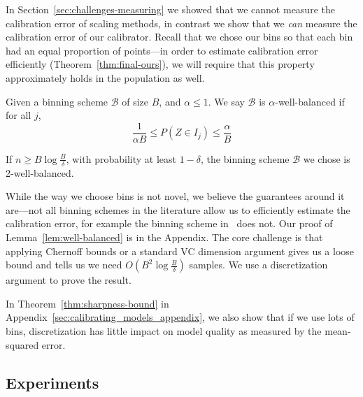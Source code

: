 In Section~\ref{sec:challenges-measuring} we showed that we cannot measure the calibration error of scaling methods, in contrast we show that we \emph{can} measure the calibration error of our calibrator. Recall that we chose our bins so that each bin had an equal proportion of points---in order to estimate calibration error efficiently (Theorem~\ref{thm:final-ours}), we will require that this property approximately holds in the population as well.

\begin{definition}
Given a binning scheme $\mathcal{B}$ of size $B$, and $\alpha \leq 1$. We say $\mathcal{B}$ is $\alpha$-well-balanced if for all $j$,
\[ \frac{1}{\alpha B} \leq P(Z \in I_j) \leq \frac{\alpha}{B}\]
\end{definition}

\begin{lemma}
\label{lem:well-balanced}
If $n \geq B\log{\frac{B}{\delta}}$, with probability at least $1 - \delta$, the binning scheme $\mathcal{B}$ we chose is 2-well-balanced.
\end{lemma}

While the way we choose bins is not novel, we believe the guarantees around it are---not all binning schemes in the literature allow us to efficiently estimate the calibration error, for example the binning scheme in~\cite{guo2017calibration} does not. Our proof of Lemma~\ref{lem:well-balanced} is in the Appendix. The core challenge is that applying Chernoff bounds or a standard VC dimension argument gives us a loose bound and tells us we need $O(B^2\log{\frac{B}{\delta}})$ samples. We use a discretization argument to prove the result.

In Theorem~\ref{thm:sharpness-bound} in Appendix~\ref{sec:calibrating_models_appendix}, we also show that if we use lots of bins, discretization has little impact on model quality as measured by the mean-squared error.



\subsection{Experiments}

